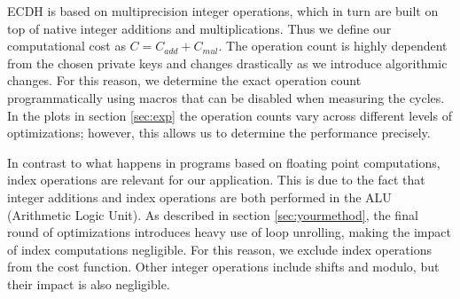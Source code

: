 ECDH is based on multiprecision integer operations, which in turn are built on top of native integer additions and multiplications. Thus we define our computational cost as $C=C_{add}+C_{mul}$. The operation count is highly dependent from the chosen private keys and changes drastically as we introduce algorithmic changes. For this reason, we determine the exact operation count programmatically using macros that can be disabled when measuring the cycles. In the plots in section \ref{sec:exp} the operation counts vary across different levels of optimizations; however, this allows us to determine the performance precisely.

In contrast to what happens in programs based on floating point computations, index operations are relevant for our application. This is due to the fact that integer additions and index operations are both performed in the ALU (Arithmetic Logic Unit). As described in section \ref{sec:yourmethod}, the final round of optimizations introduces heavy use of loop unrolling, making the impact of index computations negligible. For this reason, we exclude index operations from the cost function. Other integer operations include shifts and modulo, but their impact is also negligible.